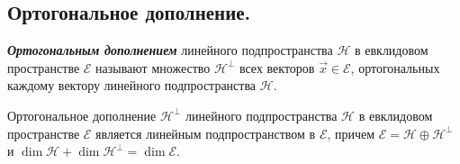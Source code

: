 \subsection{
    Ортогональное дополнение.
}

\begin{definition}
    \textit{\textbf{Ортогональным дополнением}} линейного подпространства $\mathcal{H}$ в евклидовом пространстве $\mathcal{E}$ называют множество $\mathcal{H}^\perp$ всех векторов $\vec{x} \in \mathcal{E}$, ортогональных каждому вектору линейного подпространства $\mathcal{H}$.
\end{definition}

\begin{theorem}
    Ортогональное дополнение $\mathcal{H}^\perp$ линейного подпространства $\mathcal{H}$ в евклидовом пространстве $\mathcal{E}$ является линейным подпространством в $\mathcal{E}$, причем $\mathcal{E} = \mathcal{H} \oplus \mathcal{H}^\perp$ и $\dim \mathcal{H} + \dim \mathcal{H}^\perp = \dim \mathcal{E}$.
\end{theorem}

